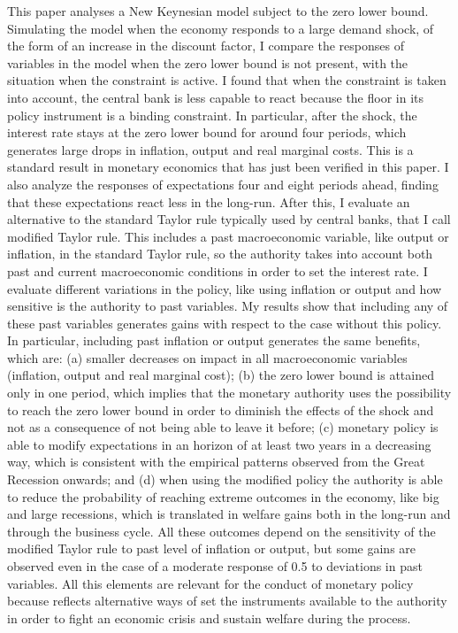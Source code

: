 \documentclass[12pt]{article}
\numberwithin{equation}{section}
\begin{document}
This paper analyses a New Keynesian model subject to the zero lower bound. Simulating the model when the economy responds to a large demand shock, of the form of an increase in the discount factor, I compare  the responses of variables in the model when the zero lower bound is not present, with the situation when the constraint is active. I found that when the constraint is taken into account, the central bank is less capable to react because the floor in its policy instrument is a binding constraint. In particular, after the shock, the interest rate stays at the zero lower bound for around four periods, which generates large drops in inflation, output and real marginal costs. This is a standard result in monetary economics that has just been verified in this paper. I also analyze the responses of expectations four and eight periods ahead, finding that these expectations react less in the long-run. After this, I evaluate an alternative to the standard Taylor rule typically used by central banks, that I call modified Taylor rule. This includes a past macroeconomic variable, like output or inflation, in the standard Taylor rule, so the authority takes into account both past and current macroeconomic conditions in order to set the interest rate. I evaluate different variations in the policy, like using inflation or output and how sensitive is the authority to past variables. My results show that including any of these past variables generates gains with respect to the case without this policy. In particular, including past inflation or output generates the same benefits, which are: (a) smaller decreases on impact in all macroeconomic variables (inflation, output and real marginal cost); (b) the zero lower bound is attained only in one period, which implies that the monetary authority uses the possibility to reach the zero lower bound in order to diminish the effects of the shock and not as a consequence of not being able to leave it before; (c) monetary policy is able to modify expectations in an horizon of at least two years in a decreasing way, which is consistent with the empirical patterns observed from the Great Recession onwards; and (d) when using the modified policy the authority is able to reduce the probability of reaching extreme outcomes in the economy, like big and large recessions, which is translated in welfare gains both in the long-run and through the business cycle. All these outcomes depend on the sensitivity of the modified Taylor rule to past level of inflation or output, but some gains are observed even in the case of a moderate response of 0.5 to deviations in past variables. All this elements are relevant for the conduct of monetary policy because reflects alternative ways of set the instruments available to the authority in order to fight an economic crisis and sustain welfare during the process.
\end{document}
